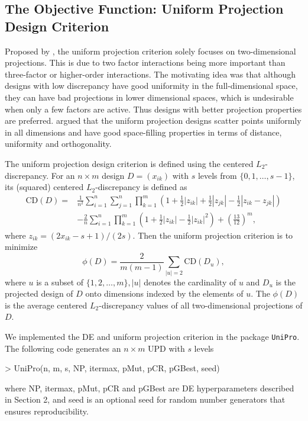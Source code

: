 \documentclass [PhD] {package/uclathes}
\begin{document}
\subsection*{The Objective Function: Uniform Projection Design Criterion}
Proposed by \textcite{sun2019uniform}, the uniform projection criterion solely focuses on  two-dimensional projections. This is due to two factor interactions being more important than three-factor or higher-order interactions. The motivating idea was that although designs with low discrepancy have good uniformity in the full-dimensional space, they can have bad projections in lower dimensional spaces, which is undesirable when only a few factors are active. Thus designs with better projection properties are preferred. \textcite{sun2019uniform} argued that the uniform projection designs scatter points uniformly in all dimensions and have good space-filling properties in terms of distance, uniformity and orthogonality.

The uniform projection design criterion is defined using the centered $L_2$-discrepancy.
For an $n \times m$ design $D=\left(x_{i k}\right)$ with $s$ levels from $\{0, 1, \ldots, s-1 \}$, its (squared) centered $L_2$-discrepancy is defined as
$$
\begin{aligned}
  \mathrm{CD}(D)= & \frac{1}{n^2} \sum_{i=1}^n \sum_{j=1}^n
  \prod_{k=1}^m\left(1+\frac{1}{2}\left|z_{i k}\right| +
  \frac{1}{2}\left|z_{j k}\right| -
  \frac{1}{2}\left|z_{i k}-z_{j k}\right|\right) \\
  & -\frac{2}{n} \sum_{i=1}^n \prod_{k=1}^m\left(1+\frac{1}{2}
  \left|z_{i k}\right|-\frac{1}{2}\left|z_{i k}\right|^2\right)+
  \left(\frac{13}{12}\right)^m,
  \end{aligned}
$$
where $z_{i k}=\left(2 x_{i k}-s+1\right) /(2 s)$. Then the uniform projection criterion is to minimize
\begin{equation}
  \phi(D)=\frac{2}{m(m-1)} \sum_{|u|=2} \mathrm{CD}\left(D_u\right),
  \label{upd}
\end{equation}
where $u$ is a subset of $\{1,2, \ldots, m\},|u|$ denotes the cardinality of $u$ and $D_u$ is the projected design of $D$ onto dimensions indexed by the elements of $u$. The $\phi(D)$ is the average centered $L_2$-discrepancy values of all two-dimensional projections of $D$.

We implemented the DE and uniform projection criterion in the package \texttt{UniPro}. %
The following code generates an $n\times m$ UPD with $s$ levels
\begin{Schunk}
\begin{Sinput}
> UniPro(n, m, s, NP, itermax, pMut, pCR, pGBest, seed)
\end{Sinput}
\end{Schunk}
where NP, itermax, pMut, pCR and pGBest are DE hyperparameters described in Section 2, and seed is an optional seed for random number generators that ensures reproducibility.
\end{document}
